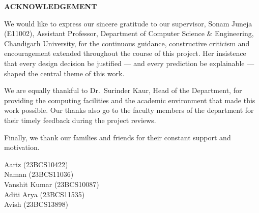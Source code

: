 \documentclass[12pt,a4paper]{report}
\newcommand{\sixteen}{\fontsize{16}{19.2}\selectfont}   %
\newcommand{\CandidateA}{Aariz (23BCS10422)}
\newcommand{\CandidateB}{Naman (23BCS11036)}
\newcommand{\CandidateC}{Vanshit Kumar (23BCS10087)}
\newcommand{\CandidateD}{Aditi Arya (23BCS11535)}
\newcommand{\CandidateE}{Avish (23BCS13898)}
\newcommand{\HoDName}{Dr.~Surinder Kaur}                %
\newcommand{\SupervisorName}{Sonam Juneja (E11002)}
\newcommand{\SupervisorDesignation}{Assistant Professor}    %
\newcommand{\DeptName}{Department of Computer Science \& Engineering}
\begin{document}
\clearpage

\begin{center}
\vspace*{0.1in}
{\bfseries\sixteen ACKNOWLEDGEMENT\par}
\end{center}
\vspace{0.3in}

We would like to express our sincere gratitude to our supervisor,
\SupervisorName, \SupervisorDesignation, \DeptName, Chandigarh University, for
the continuous guidance, constructive criticism and encouragement extended
throughout the course of this project. Her insistence that every design
decision be justified --- and every prediction be explainable --- shaped the
central theme of this work.

We are equally thankful to \HoDName, Head of the Department, for providing the
computing facilities and the academic environment that made this work
possible. Our thanks also go to the faculty members of the department for
their timely feedback during the project reviews.

Finally, we thank our families and friends for their constant support and
motivation.

\vspace{0.6in}
\hfill\begin{minipage}{0.5\textwidth}
\raggedright
\CandidateA\\
\CandidateB\\
\CandidateC\\
\CandidateD\\
\CandidateE
\end{minipage}

\clearpage

\tableofcontents
{}
\clearpage

\pagestyle{plain}
\setcounter{page}{1}

\listoffigures
\clearpage
\end{document}
